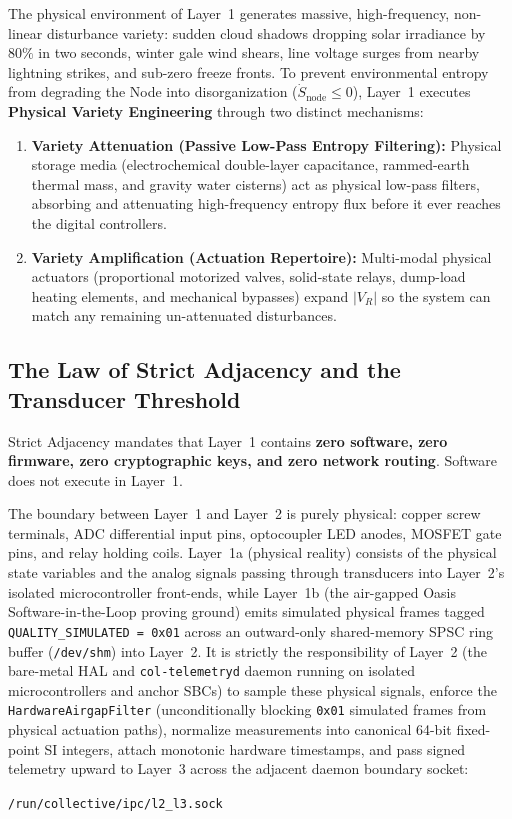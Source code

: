 The physical environment of Layer~1 generates massive, high-frequency, non-linear disturbance variety: sudden cloud shadows dropping solar irradiance by $80\%$ in two seconds, winter gale wind shears, line voltage surges from nearby lightning strikes, and sub-zero freeze fronts. To prevent environmental entropy from degrading the Node into disorganization ($\dot{S}_{\mathrm{node}} \le 0$), Layer~1 executes \textbf{Physical Variety Engineering} through two distinct mechanisms:
\begin{enumerate}
    \item \textbf{Variety Attenuation (Passive Low-Pass Entropy Filtering):} Physical storage media (electrochemical double-layer capacitance, rammed-earth thermal mass, and gravity water cisterns) act as physical low-pass filters, absorbing and attenuating high-frequency entropy flux before it ever reaches the digital controllers.
    \item \textbf{Variety Amplification (Actuation Repertoire):} Multi-modal physical actuators (proportional motorized valves, solid-state relays, dump-load heating elements, and mechanical bypasses) expand $|V_R|$ so the system can match any remaining un-attenuated disturbances.
\end{enumerate}

\subsection{The Law of Strict Adjacency and the Transducer Threshold}

Strict Adjacency mandates that Layer~1 contains \textbf{zero software, zero firmware, zero cryptographic keys, and zero network routing}. Software does not execute in Layer~1. 

The boundary between Layer~1 and Layer~2 is purely physical: copper screw terminals, ADC differential input pins, optocoupler LED anodes, MOSFET gate pins, and relay holding coils. Layer~1a (physical reality) consists of the physical state variables and the analog signals passing through transducers into Layer~2's isolated microcontroller front-ends, while Layer~1b (the air-gapped Oasis Software-in-the-Loop proving ground) emits simulated physical frames tagged \texttt{QUALITY\_SIMULATED = 0x01} across an outward-only shared-memory SPSC ring buffer (\texttt{/dev/shm}) into Layer~2. It is strictly the responsibility of Layer~2 (the bare-metal HAL and \texttt{col-telemetryd} daemon running on isolated microcontrollers and anchor SBCs) to sample these physical signals, enforce the \texttt{HardwareAirgapFilter} (unconditionally blocking \texttt{0x01} simulated frames from physical actuation paths), normalize measurements into canonical 64-bit fixed-point SI integers, attach monotonic hardware timestamps, and pass signed telemetry upward to Layer~3 across the adjacent daemon boundary socket:
\begin{center}
\texttt{/run/collective/ipc/l2\_l3.sock}
\end{center}

